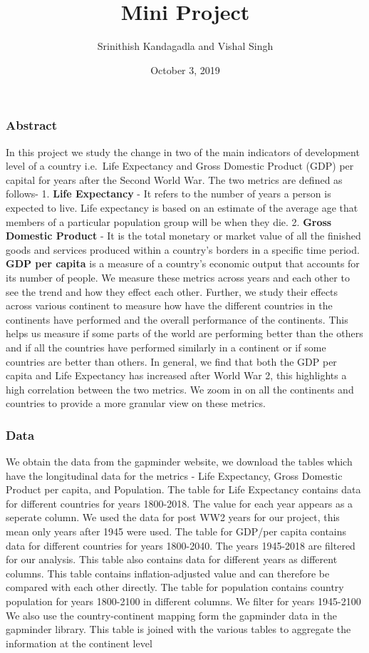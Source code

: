 \documentclass[]{article}
\title{Mini Project}
\author{Srinithish Kandagadla and Vishal Singh}
\date{October 3, 2019}
\begin{document}
\maketitle

\hypertarget{abstract}{%
\subsubsection{Abstract}\label{abstract}}

In this project we study the change in two of the main indicators of
development level of a country i.e.~Life Expectancy and Gross Domestic
Product (GDP) per capital for years after the Second World War. The two
metrics are defined as follows- 1. \textbf{Life Expectancy} - It refers
to the number of years a person is expected to live. Life expectancy is
based on an estimate of the average age that members of a particular
population group will be when they die. 2. \textbf{Gross Domestic
Product} - It is the total monetary or market value of all the finished
goods and services produced within a country's borders in a specific
time period. \textbf{GDP per capita} is a measure of a country's
economic output that accounts for its number of people. We measure these
metrics across years and each other to see the trend and how they effect
each other. Further, we study their effects across various continent to
measure how have the different countries in the continents have
performed and the overall performance of the continents. This helps us
measure if some parts of the world are performing better than the others
and if all the countries have performed similarly in a continent or if
some countries are better than others. In general, we find that both the
GDP per capita and Life Expectancy has increased after World War 2, this
highlights a high correlation between the two metrics. We zoom in on all
the continents and countries to provide a more granular view on these
metrics.

\hypertarget{data}{%
\subsubsection{Data}\label{data}}

We obtain the data from the gapminder website, we download the tables
which have the longitudinal data for the metrics - Life Expectancy,
Gross Domestic Product per capita, and Population. The table for Life
Expectancy contains data for different countries for years 1800-2018.
The value for each year appears as a seperate column. We used the data
for post WW2 years for our project, this mean only years after 1945 were
used. The table for GDP/per capita contains data for different countries
for years 1800-2040. The years 1945-2018 are filtered for our analysis.
This table also contains data for different years as different columns.
This table contains inflation-adjusted value and can therefore be
compared with each other directly. The table for population contains
country population for years 1800-2100 in different columns. We filter
for years 1945-2100 We also use the country-continent mapping form the
gapminder data in the gapminder library. This table is joined with the
various tables to aggregate the information at the continent level
\end{document}

